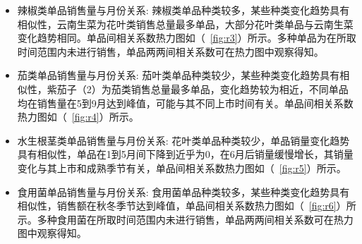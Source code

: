 \documentclass[withoutpreface,bwprint]{cumcmthesis}
\begin{document}
\begin{enumerate}
\begin{itemize}
		\item 辣椒类单品销售量与月份关系: 辣椒类单品种类较多，某些种类变化趋势具有相似性，云南生菜为花叶类销售总量最多单品，大部分花叶类单品与云南生菜变化趋势相同。单品间相关系数热力图如（~\ref{fig:r3}）所示。多种单品为在所取时间范围内未进行销售，单品两两间相关系数可在热力图中观察得知。
		\item 茄类单品销售量与月份关系: 茄叶类单品种类较少，某些种类变化趋势具有相似性，紫茄子（2）为茄类销售总量最多单品，变化趋势较为相近，不同单品均在销售量在5到9月达到峰值，可能与其不同上市时间有关。单品间相关系数热力图如（~\ref{fig:r4}）所示。
\end{itemize}
\begin{itemize}
	\item 水生根茎类单品销售量与月份关系: 花叶类单品种类较少，单品销量变化趋势具有相似性，单品在1到5月间下降到近乎为0，在6月后销量缓慢增长，其销量变化与其上市和成熟季节有关，单品间相关系数热力图如（~\ref{fig:r5}）所示。
	\item 食用菌单品销售量与月份关系: 食用菌单品种类较多，某些种类变化趋势具有相似性，销售额在秋冬季节达到峰值，单品间相关系数热力图如（~\ref{fig:r6}）所示。多种食用菌在所取时间范围内未进行销售，单品两两间相关系数可在热力图中观察得知。
\end{itemize}


\end{enumerate}
\end{document}
